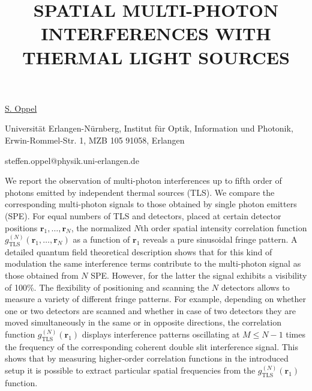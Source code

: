\title{SPATIAL MULTI-PHOTON INTERFERENCES WITH THERMAL LIGHT SOURCES}

\underline{S. Oppel} 

{\normalsize{\vspace{-4mm}
Universit\"{a}t Erlangen-N\"{u}rnberg, Institut f\"{u}r Optik,
Information und Photonik, Erwin-Rommel-Str. 1, MZB 105 91058, Erlangen


\email steffen.oppel@physik.uni-erlangen.de}}

We report the observation of multi-photon interferences up to fifth order of photons emitted by independent thermal sources (TLS). We compare the corresponding multi-photon signals to those obtained by single photon emitters (SPE). For equal numbers of TLS and detectors, placed at certain detector positions $\mathbf{r}_1,\ldots ,\mathbf{r}_N$, the normalized $N$th order spatial intensity correlation function $g^{(N)}_{\text{TLS}}(\mathbf{r}_1, \ldots ,\mathbf{r}_N)$ as a function of $\mathbf{r}_1$ reveals a pure sinusoidal fringe pattern. A detailed quantum field theoretical description shows that for this kind of modulation the same interference terms contribute to the multi-photon signal as those obtained from $N$ SPE. However, for the latter the signal exhibits a visibility of 100\%. The flexibility of positioning and scanning the $N$ detectors allows to measure a variety of different fringe patterns. For example, depending on whether one or two detectors are scanned and whether in case of two detectors they are moved simultaneously in the same or in opposite directions, the correlation function $g^{(N)}_{\text{TLS}}(\mathbf{r}_1)$ displays interference patterns oscillating at $M \leq N-1$ times the frequency of the corresponding coherent double slit interference signal. This shows that by measuring higher-order correlation functions in the introduced setup it is possible to extract particular spatial frequencies from the $g^{(N)}_{\text{TLS}}(\mathbf{r}_1)$ function.

\vspace{\baselineskip} 